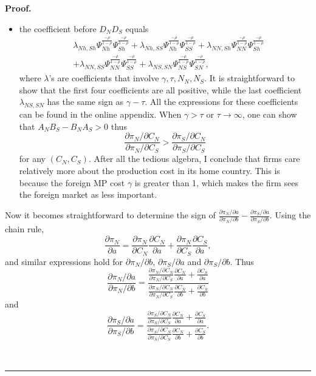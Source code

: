 \documentclass[notitlepage,11pt]{article}%
\newenvironment{proof}[1][Proof]{\noindent \textbf{#1.} }{\  \rule{0.5em}{0.5em}}
\begin{document}
\begin{proof}
\begin{itemize}
\item the coefficient before $D_{N}D_{S}$ equals%
\begin{align}
&  \lambda_{Nh,Sh}\Psi_{Nh}^{\frac{-\rho}{1-\rho}}\Psi_{Sh}^{\frac{-\rho
}{1-\rho}}+\lambda_{Nh,SS}\Psi_{Nh}^{\frac{-\rho}{1-\rho}}\Psi_{SS}%
^{\frac{-\rho}{1-\rho}}+\lambda_{NN,Sh}\Psi_{NN}^{\frac{-\rho}{1-\rho}}%
\Psi_{Sh}^{\frac{-\rho}{1-\rho}}\label{whatSign}\\
&  +\lambda_{NN,SS}\Psi_{NN}^{\frac{-\rho}{1-\rho}}\Psi_{SS}^{\frac{-\rho
}{1-\rho}}+\lambda_{NS,SN}\Psi_{NS}^{\frac{-\rho}{1-\rho}}\Psi_{SN}%
^{\frac{-\rho}{1-\rho}},\nonumber
\end{align}
where $\lambda$'s are coefficients that involve $\gamma,\tau,N_{N},N_{S}$. It
is straightforward to show that the first four coefficients are all positive,
while the last coefficient $\lambda_{NS,SN}$ has the same sign as $\gamma
-\tau$. All the expressions for these coefficients can be found in the online
appendix. When $\gamma>\tau$ or $\tau\rightarrow\infty$, one can show that
$A_{N}B_{S}-B_{N}A_{S}>0$ thus
\[
\frac{\partial\pi_{N}/\partial C_{N}}{\partial\pi_{N}/\partial C_{S}}%
>\frac{\partial\pi_{S}/\partial C_{N}}{\partial\pi_{S}/\partial C_{S}}%
\]
for any $\left(  C_{N},C_{S}\right)  $. After all the tedious algebra, I
conclude that firms care relatively more about the production cost in its home
country. This is because the foreign MP cost $\gamma$ is greater than 1, which
makes the firm sees the foreign market as less important.
\end{itemize}

Now it becomes straightforward to determine the sign of $\frac{\partial\pi
_{N}/\partial a}{\partial\pi_{N}/\partial b}-\frac{\partial\pi_{S}/\partial
a}{\partial\pi_{S}/\partial b}$. Using the chain rule,%
\[
\frac{\partial\pi_{N}}{\partial a}=\frac{\partial\pi_{N}}{\partial C_{N}}%
\frac{\partial C_{N}}{\partial a}+\frac{\partial\pi_{N}}{\partial C_{S}}%
\frac{\partial C_{S}}{\partial a},
\]
and similar expressions hold for $\partial\pi_{N}/\partial b$, $\partial
\pi_{S}/\partial a$ and $\partial\pi_{S}/\partial b$. Thus%
\[
\frac{\partial\pi_{N}/\partial a}{\partial\pi_{N}/\partial b}=\frac
{\frac{\partial\pi_{N}/\partial C_{N}}{\partial\pi_{N}/\partial C_{S}}%
\frac{\partial C_{N}}{\partial a}+\frac{\partial C_{S}}{\partial a}}%
{\frac{\partial\pi_{N}/\partial C_{N}}{\partial\pi_{N}/\partial C_{S}}%
\frac{\partial C_{N}}{\partial b}+\frac{\partial C_{S}}{\partial b}}%
\]
and%
\[
\frac{\partial\pi_{S}/\partial a}{\partial\pi_{S}/\partial b}=\frac
{\frac{\partial\pi_{S}/\partial C_{N}}{\partial\pi_{S}/\partial C_{S}}%
\frac{\partial C_{N}}{\partial a}+\frac{\partial C_{S}}{\partial a}}%
{\frac{\partial\pi_{S}/\partial C_{N}}{\partial\pi_{S}/\partial C_{S}}%
\frac{\partial C_{N}}{\partial b}+\frac{\partial C_{S}}{\partial b}}.
\]



\end{proof}
\end{document}
